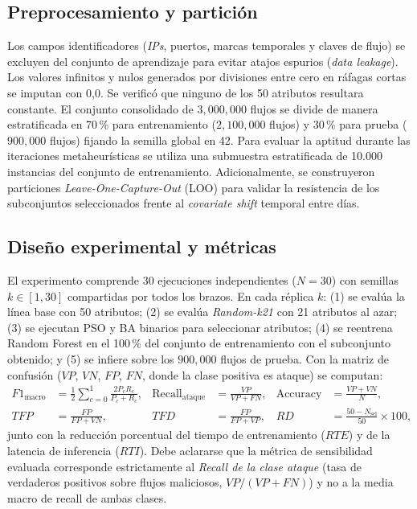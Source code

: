 \documentclass[11pt,a4paper]{article}
\begin{document}
\subsection{Preprocesamiento y partición}
Los campos identificadores (\emph{IPs}, puertos, marcas temporales y claves de flujo) se excluyen del conjunto de aprendizaje para evitar atajos espurios (\emph{data leakage}). Los valores infinitos y nulos generados por divisiones entre cero en ráfagas cortas se imputan con 0,0. Se verificó que ninguno de los 50 atributos resultara constante. El conjunto consolidado de $3{,}000{,}000$ flujos se divide de manera estratificada en 70\,\% para entrenamiento ($2{,}100{,}000$ flujos) y 30\,\% para prueba ($900{,}000$ flujos) fijando la semilla global en 42. Para evaluar la aptitud durante las iteraciones metaheurísticas se utiliza una submuestra estratificada de 10.000 instancias del conjunto de entrenamiento. Adicionalmente, se construyeron particiones \emph{Leave-One-Capture-Out} (LOO) para validar la resistencia de los subconjuntos seleccionados frente al \emph{covariate shift} temporal entre días.

\subsection{Diseño experimental y métricas}
El experimento comprende 30 ejecuciones independientes ($N = 30$) con semillas $k \in [1, 30]$ compartidas por todos los brazos. En cada réplica $k$: (1) se evalúa la línea base con 50 atributos; (2) se evalúa \emph{Random-k21} con 21 atributos al azar; (3) se ejecutan PSO y BA binarios para seleccionar atributos; (4) se reentrena Random Forest en el 100\,\% del conjunto de entrenamiento con el subconjunto obtenido; y (5) se infiere sobre los $900{,}000$ flujos de prueba. Con la matriz de confusión ($VP$, $VN$, $FP$, $FN$, donde la clase positiva es ataque) se computan:
\begin{align}
F1_{\text{macro}} &= \frac{1}{2}\sum_{c=0}^{1}\frac{2P_cR_c}{P_c+R_c}, & \text{Recall}_{\text{ataque}}&=\frac{VP}{VP+FN}, & \text{Accuracy}&=\frac{VP+VN}{N},\\
TFP &= \frac{FP}{FP+VN}, & TFD &= \frac{FP}{FP+VP}, & RD &= \frac{50-N_{\text{sel}}}{50}\times100,
\end{align}
junto con la reducción porcentual del tiempo de entrenamiento ($RTE$) y de la latencia de inferencia ($RTI$). Debe aclararse que la métrica de sensibilidad evaluada corresponde estrictamente al \emph{Recall de la clase ataque} (tasa de verdaderos positivos sobre flujos maliciosos, $VP/(VP+FN)$) y no a la media macro de recall de ambas clases.
\end{document}
